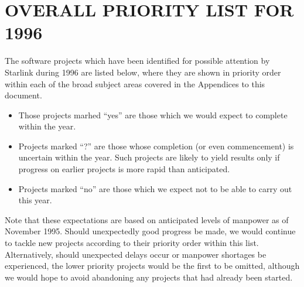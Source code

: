 \section{\label{priorities}OVERALL PRIORITY LIST FOR 1996}

The software projects which have been identified for possible
attention by Starlink during 1996 are listed below, where they are
shown in priority order within each of the broad subject areas covered
in the Appendices to this document.

\begin{itemize}
\item Those projects marhed ``yes'' are those which we would expect to
complete within the year.

\item Projects marked ``?'' are those whose completion (or even
commencement) is uncertain within the year. Such projects are likely
to yield results only if progress on earlier projects is more rapid
than anticipated.

\item Projects marked ``no'' are those which we expect not to be able to
carry out this year.
\end{itemize}

Note that these expectations are based on anticipated levels of
manpower as of November 1995. Should unexpectedly good progress be
made, we would continue to tackle new projects according to their
priority order within this list. Alternatively, should unexpected
delays occur or manpower shortages be experienced, the lower priority
projects would be the first to be omitted, although we would hope to
avoid abandoning any projects that had already been started.

\newcommand{\pry}[3]{{\bf #1 (\ref{#2:#3})} & {\bf yes} \\}
\newcommand{\prq}[3]{#1 (\ref{#2:#3}) & ? \\}
\newcommand{\prn}[3]{#1 (\ref{#2:#3}) & no \\}

